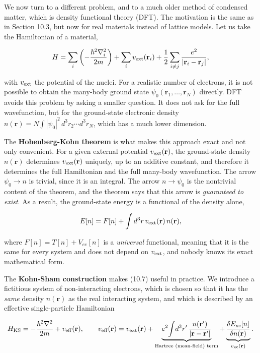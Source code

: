 We now turn to a different problem, and to a much older method of condensed matter, which is
density functional theory (DFT). The motivation is the same as in Section 10.3, but now for real
materials instead of lattice models. Let us take the Hamiltonian of a material,

\begin{equation*}
H = \sum_i \left(-\frac{\hbar^2\nabla_i^2}{2m}\right) + \sum_i v_{\rm ext}(\mathbf{r}_i) + \frac{1}{2}\sum_{i\neq j} \frac{e^2}{|\mathbf{r}_i - \mathbf{r}_j|},
\end{equation*}

with $v_{\rm ext}$ the potential of the nuclei. For a realistic number of electrons, it is not possible to obtain the many-body ground state $\psi_0(\mathbf{r}_1,\dots,\mathbf{r}_N)$ directly. DFT avoids this problem by asking a smaller question. It does not ask for the full wavefunction, but for the ground-state electronic density $n(\mathbf{r}) = N\int |\psi_0|^2\, d^3r_2\cdots d^3r_N$, which has a much lower dimension.

The \textbf{Hohenberg-Kohn theorem} is what makes this approach exact and not only convenient. For
a given external potential $v_{\rm ext}(\mathbf{r})$, the ground-state density $n(\mathbf{r})$
determines $v_{\rm ext}(\mathbf{r})$ uniquely, up to an additive constant, and therefore it
determines the full Hamiltonian and the full many-body wavefunction. The arrow $\psi_0 \to n$ is
trivial, since it is an integral. The arrow $n \to \psi_0$ is the nontrivial content of the
theorem, and the theorem says that this arrow is \emph{guaranteed to exist}. As a result, the
ground-state energy is a functional of the density alone,

\begin{equation}
E[n] = F[n] + \int d^3r\, v_{\rm ext}(\mathbf{r})\, n(\mathbf{r}),
\end{equation}

where $F[n] = T[n] + V_{ee}[n]$ is a \emph{universal} functional, meaning that it is the same for
every system and does not depend on $v_{\rm ext}$, and nobody knows its exact mathematical form.

The \textbf{Kohn-Sham construction} makes (10.7) useful in practice. We introduce a fictitious
system of non-interacting electrons, which is chosen so that it has the \emph{same} density
$n(\mathbf{r})$ as the real interacting system, and which is described by an effective
single-particle Hamiltonian

\begin{equation}
H_{\rm KS} = -\frac{\hbar^2\nabla^2}{2m} + v_{\rm eff}(\mathbf{r}), \qquad v_{\rm eff}(\mathbf{r}) = v_{\rm ext}(\mathbf{r}) + \underbrace{e^2\!\int\! d^3r'\, \frac{n(\mathbf{r}')}{|\mathbf{r}-\mathbf{r}'|}}_{\text{Hartree (mean-field) term}} + \underbrace{\frac{\delta E_{\rm xc}[n]}{\delta n(\mathbf{r})}}_{v_{\rm xc}(\mathbf{r})}.
\end{equation}

